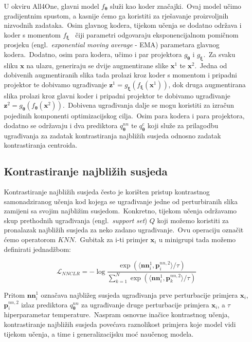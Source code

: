 \documentclass[diplomskirad]{fer}
\begin{document}
U okviru All4One, glavni model $f_{\bm{\theta}}$ služi kao koder značajki.\ Ovaj model učimo gradijentnim spustom, a kasnije ćemo ga koristiti za rješavanje proizvoljnih nizvodnih zadataka.\ Osim glavnog kodera, tijekom učenja se dodatno održava i koder s momentom $f_{\bm{\xi}}$~\cite{pham2022pros} čiji parametri odgovaraju eksponencijalnom pomičnom prosjeku (engl.\ \textit{exponential moving average} - EMA) parametara glavnog kodera.\
Dodatno, osim para kodera, učimo i par projektora $g_{\bm{\theta}}$ i $g_{\bm{\xi}}$.\ Za svaku sliku $\bm{x}$ na ulazu, generiraju se dvije augmentirane slike $\bm{x}^1$ te $\bm{x}^2$.\ 
Jedna od dobivenih augmentiranih slika tada prolazi kroz koder s momentom i pripadni projektor te dobivamo ugrađivanje $\bm{z}^1 = g_{\bm{\xi}}(f_{\bm{\xi}}(\bm{x}^1))$, dok druga augmentirana slika prolazi kroz glavni koder i pripadni projektor te dobivamo ugrađivanje $\bm{z}^2 = g_{\bm{\theta}}(f_{\bm{\theta}}(\bm{x}^2))$.\
Dobivena ugrađivanja dalje se mogu koristiti za izračun pojedinih komponenti optimizacijskog cilja.\ Osim para kodera i para projektora, dodatno se održavaju i dva prediktora $q_{\bm{\theta}}^{nn}$ te $q_{\bm{\theta}}^{c}$ koji služe za prilagodbu ugrađivanja za zadatak kontrastiranja najbližih susjeda odnosno zadatak kontrastiranja centroida.\

\subsection{Kontrastiranje najbližih susjeda}
\label{sub:knn}

Kontrastiranje najbližih susjeda često je korišten pristup kontrastnog samonadziranog učenja kod kojega se ugrađivanje jedne od perturbiranih slika zamijeni sa svojim najbližim susjedom.\ 
Konkretno, tijekom učenja održavamo skup prethodnih ugrađivanja (engl.\ \textit{support set}) $Q$ koji možemo koristiti za pronalazak najbližih susjeda za neko zadano ugrađivanje.\ Ovu operaciju označit ćemo operatorom $KNN$.\ 
Gubitak za i-ti primjer $\bm{x}_i$ u minigrupi tada možemo definirati jednadžbom:

\begin{equation}
  \mathcal{L}_{NNCLR} = - \log{\frac{\exp(\langle \bm{nn}_{i}^{1}, \bm{p}_{i}^{nn, 2} \rangle / \tau)}{\sum_{k=1}^{N}{\exp(\langle \bm{nn}_{i}^{1}, \bm{p}_{k}^{nn, 2} \rangle / \tau)}}}
  \label{eq:NNCLR_loss}
\end{equation}

Pritom $\bm{nn}_{i}^{1}$ označava najbližeg susjeda ugrađivanja prve perturbacije primjera $\bm{x}_i$, $\bm{p}_{i}^{nn, 2}$ izlaz prediktora $q_{\bm{\theta}}^{nn}$ za ugrađivanje druge perturbacije primjera $\bm{x}_i$, a $\tau$ hiperparametar temperature.\ 
Naspram osnovne inačice kontrastnog učenja, kontrastiranje najbližih susjeda povećava raznolikost primjera koje model vidi tijekom učenja, a time i generalizacijsku moć naučenog modela.\ 
\end{document}

